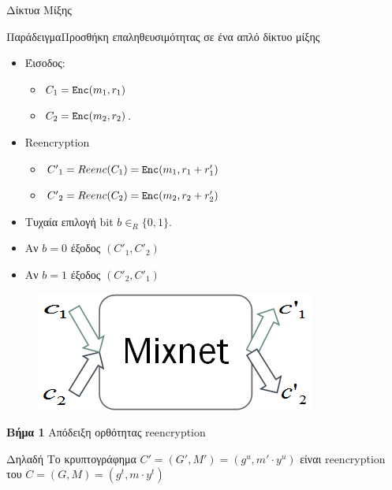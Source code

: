 \documentclass[handout]{beamer}
\begin{document}
\begin{section}{Δίκτυα Μίξης}
\begin{frame}[allowframebreaks]{Παράδειγμα}{Προσθήκη επαληθευσιμότητας σε ένα απλό δίκτυο μίξης} 

\begin{multicols}{2}
    \begin{itemize}
        \item Έισοδος: 
        \begin{itemize}
            \item  $C_1 = \mathtt{Enc}(m_1,r_1)$
            \item $C_2 = \mathtt{Enc}(m_2,r_2)$.
        \end{itemize}
        
        \item Reencryption
          \begin{itemize}
        \item ${C'}_1 = Reenc(C_1)=\mathtt{Enc}(m_1,r_1+r_1')$ \item ${C'}_2 = Reenc(C_2)=\mathtt{Enc}(m_2,r_2+r_2')$
           \end{itemize}
        \item Tυχαία επιλογή bit $b \in_R \{0,1\}$.
        \item Αν $b=0$ έξοδος $({C'}_1, {C'}_2)$ 
        \item Αν $b=1$ έξοδος $({C'}_2, {C'}_1)$
    \end{itemize}
    \vfill \columnbreak
    \vspace*{\fill}
    \begin{figure}
        \includegraphics[scale=0.5]{mix2x2.PNG}
    \end{figure}
    \vspace*{\fill}

\end{multicols}

\framebreak
 
\textbf{Βήμα 1} Απόδειξη ορθότητας reencryption 

\begin{block}{Δηλαδή}
Το κρυπτογράφημα ${C'} = (G',M') = (g^u,m' \cdot y^u)$ είναι reencryption του $C = (G,M) = (g^t,m \cdot y^t)$
\end{block}


\end{frame}
\end{section}
\end{document}

